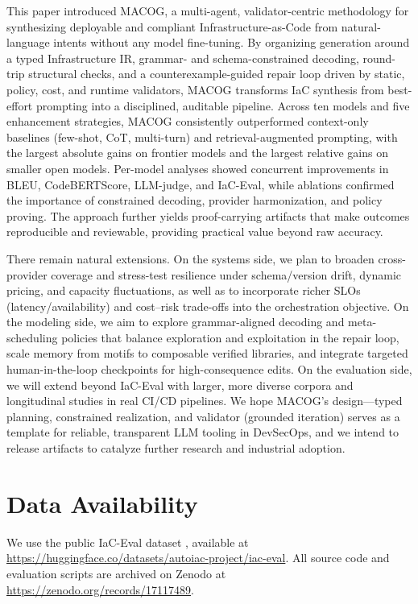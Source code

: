 \documentclass[acmsmall,screen,review,anonymous]{acmart}
\begin{document}
This paper introduced MACOG, a multi-agent, validator-centric methodology for synthesizing deployable and compliant Infrastructure-as-Code from natural-language intents without any model fine-tuning. By organizing generation around a typed Infrastructure IR, grammar- and schema-constrained decoding, round-trip structural checks, and a counterexample-guided repair loop driven by static, policy, cost, and runtime validators, MACOG transforms IaC synthesis from best-effort prompting into a disciplined, auditable pipeline. Across ten models and five enhancement strategies, MACOG consistently outperformed context-only baselines (few-shot, CoT, multi-turn) and retrieval-augmented prompting, with the largest absolute gains on frontier models and the largest relative gains on smaller open models. Per-model analyses showed concurrent improvements in BLEU, CodeBERTScore, LLM-judge, and IaC-Eval, while ablations confirmed the importance of constrained decoding, provider harmonization, and policy proving. The approach further yields proof-carrying artifacts that make outcomes reproducible and reviewable, providing practical value beyond raw accuracy.

There remain natural extensions. On the systems side, we plan to broaden cross-provider coverage and stress-test resilience under schema/version drift, dynamic pricing, and capacity fluctuations, as well as to incorporate richer SLOs (latency/availability) and cost–risk trade-offs into the orchestration objective. On the modeling side, we aim to explore grammar-aligned decoding and meta-scheduling policies that balance exploration and exploitation in the repair loop, scale memory from motifs to composable verified libraries, and integrate targeted human-in-the-loop checkpoints for high-consequence edits. On the evaluation side, we will extend beyond IaC-Eval with larger, more diverse corpora and longitudinal studies in real CI/CD pipelines. We hope MACOG’s design—typed planning, constrained realization, and validator (grounded iteration) serves as a template for reliable, transparent LLM tooling in DevSecOps, and we intend to release artifacts to catalyze further research and industrial adoption.

\section{Data Availability}
We use the public IaC-Eval dataset \cite{kon2024iac}, available at \url{https://huggingface.co/datasets/autoiac-project/iac-eval}.
All source code and evaluation scripts are archived on Zenodo at \url{https://zenodo.org/records/17117489}.
\end{document}
